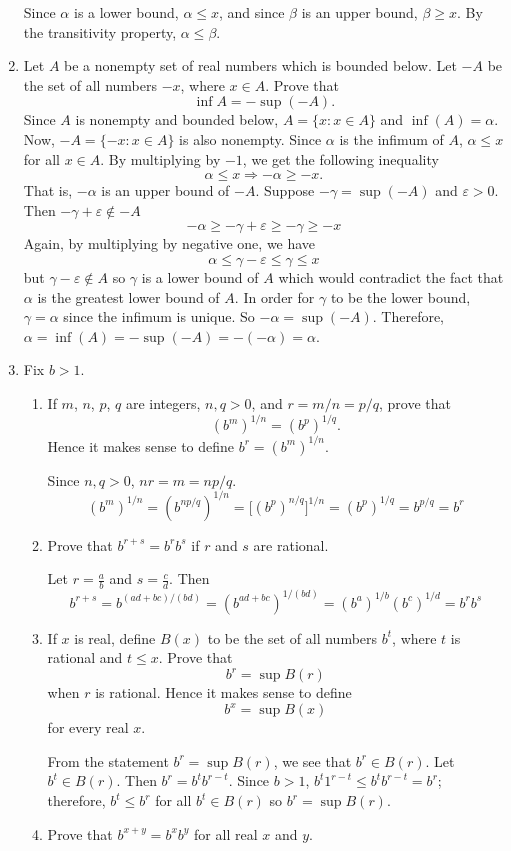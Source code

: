 \begin{enumerate}
  Since \(\alpha\) is a lower bound, \(\alpha\leq x\), and since \(\beta\) is
  an upper bound, \(\beta\geq x\).
  By the transitivity property, \(\alpha\leq\beta\).
\item
  Let \(A\) be a nonempty set of real numbers which is bounded below.
  Let \(-A\) be the set of all numbers \(-x\), where \(x\in A\).
  Prove that
  \[
  \inf A = -\sup(-A).
  \]
  Since \(A\) is nonempty and bounded below, \(A = \{x:x\in A\}\) and
  \(\inf(A) = \alpha\).
  Now, \(-A = \{-x:x\in A\}\) is also nonempty.
  Since \(\alpha\) is the infimum of \(A\), \(\alpha\leq x\) for all
  \(x\in A\).
  By multiplying by \(-1\), we get the following inequality
  \[
  \alpha\leq x\Rightarrow -\alpha\geq -x.
  \]
  That is, \(-\alpha\) is an upper bound of \(-A\).
  Suppose \(-\gamma = \sup(-A)\) and \(\varepsilon > 0\).
  Then \(-\gamma + \varepsilon\not\in -A\)
  \[
  -\alpha\geq -\gamma + \varepsilon\geq -\gamma\geq -x
  \]
  Again, by multiplying by negative one, we have
  \[
  \alpha\leq \gamma - \varepsilon\leq\gamma\leq x
  \]
  but \(\gamma - \varepsilon\notin A\) so \(\gamma\) is a lower bound of
  \(A\) which would contradict the fact that \(\alpha\) is the greatest lower
  bound of \(A\). 
  In order for \(\gamma\) to be the lower bound, \(\gamma = \alpha\) since the
  infimum is unique.
  So \(-\alpha = \sup(-A)\).
  Therefore, \(\alpha = \inf(A) = -\sup(-A) = -(-\alpha) = \alpha\).
\item
  Fix \(b > 1\).
  \begin{enumerate}[label = (\alph*)]
  \item
    If \(m\), \(n\), \(p\), \(q\) are integers, \(n, q > 0\), and
    \(r = m/n = p/q\), prove that
    \[
    (b^m)^{1/n} = (b^p)^{1/q}.
    \]
    Hence it makes sense to define \(b^r = (b^m)^{1/n}\).
    \par\smallskip
    Since \(n, q > 0\), \(nr = m = np/q\).
    \[
    (b^m)^{1/n} = (b^{np/q})^{1/n} = \bigl[(b^p)^{n/q}\bigr]^{1/n} =
    (b^p)^{1/q} = b^{p/q} = b^r
    \]
  \item
    Prove that \(b^{r + s} = b^rb^s\) if \(r\) and \(s\) are rational.
    \par\smallskip
    Let \(r = \frac{a}{b}\) and \(s = \frac{c}{d}\).
    Then
    \[
    b^{r + s} = b^{(ad + bc)/(bd)} = (b^{ad + bc})^{1/(bd)} =
    (b^a)^{1/b}(b^c)^{1/d} = b^rb^s
    \]
  \item
    If \(x\) is real, define \(B(x)\) to be the set of all numbers \(b^t\),
    where \(t\) is rational and \(t\leq x\).
    Prove that
    \[
    b^r = \sup B(r)
    \]
    when \(r\) is rational.
    Hence it makes sense to define
    \[
    b^x = \sup B(x)
    \]
    for every real \(x\).
    \par\smallskip
    From the statement \(b^r = \sup B(r)\), we see that \(b^r\in B(r)\).
    Let \(b^t\in B(r)\).
    Then \(b^r = b^tb^{r - t}\).
    Since \(b > 1\), \(b^t1^{r - t}\leq b^tb^{r - t} = b^r\); therefore,
    \(b^t\leq b^r\) for all \(b^t\in B(r)\) so \(b^r = \sup B(r)\).
  \item
    Prove that \(b^{x + y} = b^xb^y\) for all real \(x\) and \(y\).
    \par\smallskip
    

\end{enumerate}
\end{enumerate}
